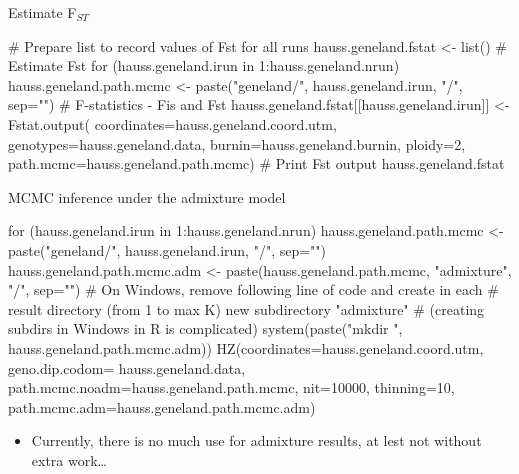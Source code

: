 \documentclass[compress, ucs, xelatex, 11pt, xcolor=svgnames, aspectratio=169,
	hyperref={
		bookmarks=true,
		unicode=true,
		colorlinks=true,
		pdftitle={Molecular data in R},
		plainpages=false,
		pdfauthor={Vojtech Zeisek},
		pdfsubject={Course about phylogeny and evolution in R},
		pdfcreator={XeLaTeX},
		pdfkeywords={R, evolution, phylogeny, molecular data},
		linkcolor=Crimson, %
		anchorcolor=Magenta, %
		citecolor=Magenta, %
		filecolor=Magenta, %
		menucolor=Magenta, %
		urlcolor=DodgerBlue, %
		pdftex},
	url={hyphens, lowtilde} %
	]{beamer}
\begin{document}
\begin{frame}[fragile]{Estimate F$_{ST}$}
	\begin{spluscode}
    # Prepare list to record values of Fst for all runs
    hauss.geneland.fstat <- list()
    # Estimate Fst
    for (hauss.geneland.irun in 1:hauss.geneland.nrun) {
      hauss.geneland.path.mcmc <- paste("geneland/",
      hauss.geneland.irun, "/", sep="")
      # F-statistics - Fis and Fst
      hauss.geneland.fstat[[hauss.geneland.irun]] <- Fstat.output(
        coordinates=hauss.geneland.coord.utm,
        genotypes=hauss.geneland.data,
        burnin=hauss.geneland.burnin, ploidy=2,
        path.mcmc=hauss.geneland.path.mcmc)
      }
      # Print Fst output
      hauss.geneland.fstat
	\end{spluscode}
\end{frame}

\begin{frame}[fragile]{MCMC inference under the admixture model}
	\begin{spluscode}
    for (hauss.geneland.irun in 1:hauss.geneland.nrun) {
      hauss.geneland.path.mcmc <- paste("geneland/",
        hauss.geneland.irun, "/", sep="")
      hauss.geneland.path.mcmc.adm <- paste(hauss.geneland.path.mcmc,
        "admixture", "/", sep="")
      # On Windows, remove following line of code and create in each
      # result directory (from 1 to max K) new subdirectory "admixture"
      # (creating subdirs in Windows in R is complicated)
      system(paste("mkdir ", hauss.geneland.path.mcmc.adm))
      HZ(coordinates=hauss.geneland.coord.utm, geno.dip.codom=
        hauss.geneland.data, path.mcmc.noadm=hauss.geneland.path.mcmc,
        nit=10000, thinning=10,
        path.mcmc.adm=hauss.geneland.path.mcmc.adm)
      }
	\end{spluscode}
	\begin{itemize}
		\item Currently, there is no much use for admixture results, at lest not without extra work\ldots
	\end{itemize}
\end{frame}
\end{document}
